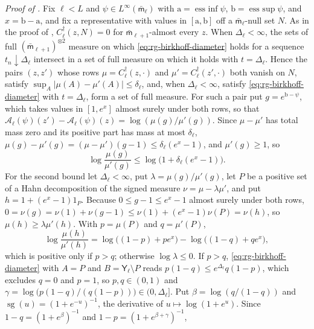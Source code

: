 \noindent\emph{Proof of .}
Fix $\ell<L$ and $\psi\in L^\infty(\bar{\mathsf m}_\ell)$ with
$\mathrm a=\operatorname*{ess~inf}\psi$, $\mathrm b=\operatorname*{ess~sup}\psi$, and
$x=\mathrm b-\mathrm a$, and fix a representative with values in
$[\mathrm a,\mathrm b]$ off a $\bar{\mathsf m}_\ell$-null set $N$. As in the proof of
, $C^\dagger_\ell(z,N)=0$ for
$\bar{\mathsf m}_{\ell+1}$-almost every $z$. When $\Delta_\ell<\infty$, the sets of
full $(\bar{\mathsf m}_{\ell+1})^{\otimes2}$ measure on which
\eqref{eq:rg-birkhoff-diameter} holds for a sequence $t_n\downarrow\Delta_\ell$
intersect in a set of full measure on which it holds with $t=\Delta_\ell$. Hence the
pairs $(z,z')$ whose rows $\mu=C^\dagger_\ell(z,\cdot)$ and
$\mu'=C^\dagger_\ell(z',\cdot)$ both vanish on $N$, satisfy
$\sup_A\lvert\mu(A)-\mu'(A)\rvert\le\delta_\ell$, and, when $\Delta_\ell<\infty$,
satisfy \eqref{eq:rg-birkhoff-diameter} with $t=\Delta_\ell$, form a set of full
measure. For such a pair put $g=e^{\mathrm b-\psi}$, which takes values in $[1,e^x]$
almost surely under both rows, so that
$\mathcal A_\ell(\psi)(z')-\mathcal A_\ell(\psi)(z)=\log(\mu(g)/\mu'(g))$. Since
$\mu-\mu'$ has total mass zero and its positive part has mass at most $\delta_\ell$,
$\mu(g)-\mu'(g)=(\mu-\mu')(g-1)\le\delta_\ell(e^x-1)$, and $\mu'(g)\ge1$, so
\begin{equation*}
\log\frac{\mu(g)}{\mu'(g)}\le\log\bigl(1+\delta_\ell(e^x-1)\bigr).
\end{equation*}
For the second bound let $\Delta_\ell<\infty$, put $\lambda=\mu(g)/\mu'(g)$, let $P$
be a positive set of a Hahn decomposition of the signed measure
$\nu=\mu-\lambda\mu'$, and put $h=1+(e^x-1)1_P$. Because $0\le g-1\le e^x-1$ almost
surely under both rows, $0=\nu(g)=\nu(1)+\nu(g-1)\le\nu(1)+(e^x-1)\nu(P)=\nu(h)$, so
$\mu(h)\ge\lambda\mu'(h)$. With $p=\mu(P)$ and $q=\mu'(P)$,
\begin{equation*}
\log\frac{\mu(h)}{\mu'(h)}=\log\bigl((1-p)+pe^x\bigr)-\log\bigl((1-q)+qe^x\bigr),
\end{equation*}
which is positive only if $p>q$; otherwise $\log\lambda\le0$. If $p>q$, \eqref{eq:rg-birkhoff-diameter} with
$A=P$ and $B=\mathsf Y_\ell\setminus P$ reads $p(1-q)\le e^{\Delta_\ell}q(1-p)$, which
excludes $q=0$ and $p=1$, so $p,q\in(0,1)$ and
$\gamma=\log\bigl(p(1-q)/(q(1-p))\bigr)\in(0,\Delta_\ell]$. Put
$\beta=\log(q/(1-q))$ and $\operatorname{sg}(u)=(1+e^{-u})^{-1}$, the derivative of
$u\mapsto\log(1+e^u)$. Since $1-q=(1+e^\beta)^{-1}$ and $1-p=(1+e^{\beta+\gamma})^{-1}$,
